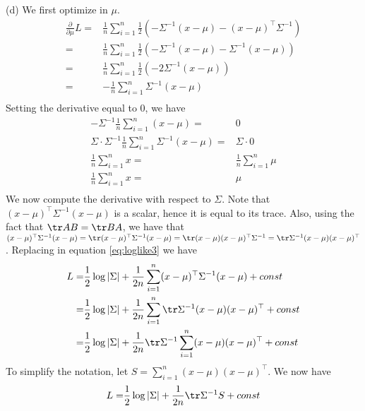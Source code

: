 \documentclass[12pt,english]{amsart}
\theoremstyle{definition}
\begin{document}
(d) We first optimize in $\mu$. 
\begin{equation}
\begin{split}
   \frac{\partial}{\partial \mu} L
=& \frac{1}{n} \sum_{i=1}^{n} \frac{1}{2}\left(-\Sigma^{-1}(x-\mu)- (x-\mu)^\top \Sigma^{-1} \right)\\
=& \frac{1}{n} \sum_{i=1}^{n} \frac{1}{2}\left(-\Sigma^{-1}(x-\mu)- \Sigma^{-1}(x-\mu) \right)\\
=& \frac{1}{n} \sum_{i=1}^{n} \frac{1}{2}\left(-2\Sigma^{-1}(x-\mu) \right)\\
=& -\frac{1}{n} \sum_{i=1}^{n}\Sigma^{-1}(x-\mu) \\
\end{split}
\end{equation}
Setting the derivative equal to 0, we have
\begin{equation}
\begin{split}
 -\Sigma^{-1}\frac{1}{n} \sum_{i=1}^{n}(x-\mu)=&0 \\
\Sigma\cdot \Sigma^{-1}\frac{1}{n} \sum_{i=1}^{n}\Sigma^{-1}(x-\mu)=&\Sigma \cdot 0 \\
\frac{1}{n} \sum_{i=1}^{n}x=& \frac{1}{n} \sum_{i=1}^{n}\mu \\
\frac{1}{n} \sum_{i=1}^{n}x=& \mu \\
\end{split}
\end{equation}
We now compute the derivative with respect to $\Sigma$. Note that $(x-\mu)^\top\Sigma^{-1}(x-\mu)$ is a scalar, hence it is equal to its trace. Also, using the fact that $\tr AB = \tr BA$, we have that  $(x-\mu)^\top\Sigma^{-1}(x-\mu)=\tr (x-\mu)^\top\Sigma^{-1}(x-\mu)=\tr (x-\mu)(x-\mu)^\top\Sigma^{-1}=\tr \Sigma^{-1}(x-\mu)(x-\mu)^\top$. Replacing in equation \ref{eq:loglike3} we have
\begin{equation}
\begin{split}
    L 
=& \frac{1}{2}\log|\Sigma| + \frac{1}{2n}\sum_{i=1}^n(x-\mu)^\top\Sigma^{-1}(x-\mu) + const\\
=& \frac{1}{2}\log|\Sigma| + \frac{1}{2n}\sum_{i=1}^n\tr \Sigma^{-1}(x-\mu)(x-\mu)^\top + const\\
=& \frac{1}{2}\log|\Sigma| + \frac{1}{2n}\tr\Sigma^{-1}\sum_{i=1}^n(x-\mu)(x-\mu)^\top + const\\
\end{split}
\label{eq:loglike4}
\end{equation}
To simplify the notation, let $S=\sum_{i=1}^n(x-\mu)(x-\mu)^\top$. We now have
\begin{equation}
\begin{split}
    L 
=& \frac{1}{2}\log|\Sigma| + \frac{1}{2n}\tr\Sigma^{-1}S + const\\
\end{split}
\label{eq:loglike5}
\end{equation}
\end{document}
